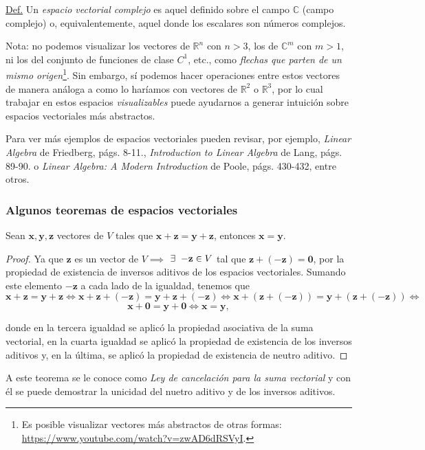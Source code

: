 \documentclass[12pt]{article}
\newenvironment{teorema}[2][Teorema]{\begin{trivlist}
\item[\hskip \labelsep {\bfseries #1}\hskip \labelsep {\bfseries #2.}]}{\end{trivlist}}
\begin{document}
\begin{tcolorbox}
\underline{Def.} Un \textit{espacio vectorial complejo} es aquel definido sobre el campo $\mathbb{C}$ (campo complejo) o, equivalentemente, aquel donde los escalares son números complejos.
\end{tcolorbox}{}

Nota: no podemos visualizar los vectores de $\mathbb{R}^n$ con $n>3$, los de $\mathbb{C}^m$ con $m>1$, ni los del conjunto de funciones de clase $C^1$, etc., como \emph{flechas que parten de un mismo origen}\footnote{Es posible visualizar vectores más abstractos de otras formas: \url{https://www.youtube.com/watch?v=zwAD6dRSVyI}.}. Sin embargo, sí podemos hacer operaciones entre estos vectores de manera análoga a como lo haríamos con vectores de $\mathbb{R}^2$ o $\mathbb{R}^3$, por lo cual trabajar en estos espacios \emph{visualizables} puede ayudarnos a generar intuición sobre espacios vectoriales más abstractos.

\vspace{3mm}
Para ver más ejemplos de espacios vectoriales pueden revisar, por ejemplo, \textit{Linear Algebra} de Friedberg, págs. 8-11., \textit{Introduction to Linear Algebra} de Lang, págs. 89-90. o \textit{Linear Algebra: A Modern Introduction} de Poole, págs. 430-432, entre otros.

\subsubsection{Algunos teoremas de espacios vectoriales}

\begin{teorema} 1
Sean $\mathbf{x},\mathbf{y},\mathbf{z}$ vectores de $V$ tales que $\mathbf{x}+\mathbf{z}=\mathbf{y}+\mathbf{z}$, entonces $\mathbf{x}=\mathbf{y}$.

\begin{proof}
Ya que $\mathbf{z}$ es un vector de $V\implies$ $\exists\hspace{2mm} \mathbf{-z}\in V$ tal que $\mathbf{z} + (-\mathbf{z}) = \mathbf{0}$, por la propiedad de existencia de inversos aditivos de los espacios vectoriales. Sumando este elemento $-\mathbf{z}$ a cada lado de la igualdad, tenemos que $$\mathbf{x}+\mathbf{z}=\mathbf{y}+\mathbf{z}\iff\mathbf{x}+\mathbf{z}+ (-\mathbf{z})=\mathbf{y}+\mathbf{z}+ (-\mathbf{z})\iff\mathbf{x}+(\mathbf{z}+ (-\mathbf{z}))=\mathbf{y}+(\mathbf{z}+ (-\mathbf{z}))\iff$$ $$ \mathbf{x}+\mathbf{0}=\mathbf{y}+\mathbf{0}\iff\mathbf{x}=\mathbf{y},$$

\noindent donde en la tercera igualdad se aplicó la propiedad asociativa de la suma vectorial, en la cuarta igualdad se aplicó la propiedad de existencia de los inversos aditivos y, en la última, se aplicó la propiedad de existencia de neutro aditivo.
\end{proof}
A este teorema se le conoce como \emph{Ley de cancelación para la suma vectorial} y con él se puede demostrar la unicidad del nuetro aditivo y de los inversos aditivos.
\end{teorema}
\end{document}
